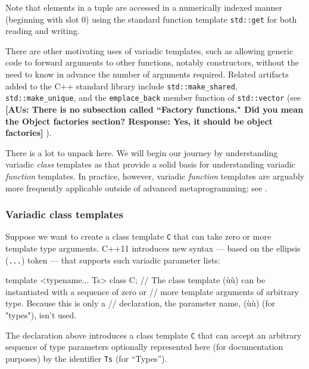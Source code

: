 \noindent Note that elements in a tuple are accessed in a numerically indexed
manner (beginning with slot 0) using the standard function template
\lstinline!std::get! for both reading and writing.

There are other motivating uses of variadic templates, such as allowing
generic code to forward arguments to other functions, notably
constructors, without the need to know in advance the number of
arguments required. Related artifacts added to the C++ standard library
include \lstinline!std::make_shared!, \lstinline!std::make_unique!, and the
\lstinline!emplace_back! member function of \lstinline!std::vector! (see
 \textbf{ [AUs: There is no subsection called ``Factory functions." Did you mean the Object factories section?  Response: Yes, it should be object factories]} ).

There is a lot to unpack here. We will begin our journey by
understanding variadic \emph{class} templates as 
that provide a solid basis for understanding variadic \emph{function}
templates. In practice, however, variadic \emph{function} templates are
arguably more frequently applicable outside of advanced metaprogramming;
see .

\subsubsection[Variadic class templates]{Variadic class templates}\label{variadic-class-templates}

Suppose we want to create a class template \lstinline!C! that can take zero
or more template type arguments. C++11 introduces new syntax --- based
on the ellipsis (\lstinline!...!) token --- that supports such variadic
parameter lists:

\begin{emcppslisting}
template <typename... Ts> class C;
    // The class template (ù{}ù) can be instantiated with a sequence of zero or
    // more template arguments of arbitrary type. Because this is only a
    // declaration, the parameter name, (ù{}ù) (for "types"), isn't used.
\end{emcppslisting}
    

\noindent The declaration above introduces a class template \lstinline!C! that can
accept an arbitrary sequence of type parameters optionally represented
here (for documentation purposes) by the identifier \lstinline!Ts! (for
``Types'').

